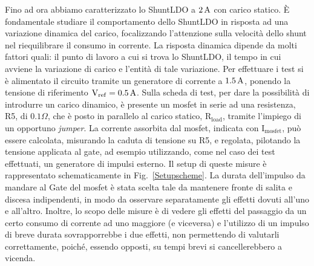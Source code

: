 Fino ad ora abbiamo caratterizzato lo ShuntLDO a $2 \rm \, A$ con carico statico.
\`E fondamentale studiare il comportamento dello ShuntLDO in risposta ad una variazione dinamica del carico, focalizzando l'attenzione sulla velocità dello shunt nel riequilibrare il consumo in corrente. 
La risposta dinamica dipende da molti fattori quali: il punto di lavoro a cui si trova lo ShuntLDO, il tempo in cui avviene la variazione di carico e l'entità di tale variazione. 
Per effettuare i test si è alimentato il circuito tramite un generatore di corrente a $1.5 \rm \, A$, ponendo la tensione di riferimento $\mathrm{V_{ref}=0.5 \rm \, A}$. %
Sulla scheda di test, per dare la possibilità di introdurre un carico dinamico, è presente un mosfet in serie ad una resistenza, R5, di $0.1 \Omega$, che è posto in parallelo al carico statico, $\mathrm{R_{load}}$, tramite l'impiego di un opportuno {\em jumper}.
La corrente assorbita dal mosfet, indicata con $\mathrm{I_{mosfet}}$, può essere calcolata, misurando la caduta di tensione su R5, e regolata, pilotando la tensione applicata al gate, ad esempio utilizzando, come nel caso dei test effettuati, un generatore di impulsi esterno.
Il setup di queste misure è rappresentato schematicamente in Fig.~\ref{Setupscheme}.
La durata dell'impulso da mandare al Gate del mosfet è stata scelta tale da mantenere fronte di salita e discesa indipendenti, in modo da osservare separatamente gli effetti dovuti all'uno e all'altro.
Inoltre, lo scopo delle misure è di vedere gli effetti del passaggio da un certo consumo di corrente ad uno maggiore (e viceversa) e l'utilizzo di un impulso di breve durata sovrapporrebbe i due effetti, non permettendo di valutarli correttamente, poiché, essendo opposti, su tempi brevi si cancellerebbero a vicenda.
